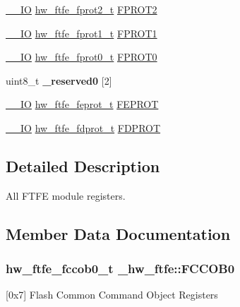 \begin{DoxyCompactItemize}
\item 
\hyperlink{core__sc300_8h_aec43007d9998a0a0e01faede4133d6be}{\+\_\+\+\_\+\+IO} \hyperlink{union__hw__ftfe__fprot2}{hw\+\_\+ftfe\+\_\+fprot2\+\_\+t} \hyperlink{struct__hw__ftfe_a860b1772fd409f3168df994f34e2b3ee}{F\+P\+R\+O\+T2}
\item 
\hyperlink{core__sc300_8h_aec43007d9998a0a0e01faede4133d6be}{\+\_\+\+\_\+\+IO} \hyperlink{union__hw__ftfe__fprot1}{hw\+\_\+ftfe\+\_\+fprot1\+\_\+t} \hyperlink{struct__hw__ftfe_acb23a282239b6ec6378d99218078504e}{F\+P\+R\+O\+T1}
\item 
\hyperlink{core__sc300_8h_aec43007d9998a0a0e01faede4133d6be}{\+\_\+\+\_\+\+IO} \hyperlink{union__hw__ftfe__fprot0}{hw\+\_\+ftfe\+\_\+fprot0\+\_\+t} \hyperlink{struct__hw__ftfe_ad562d41672bfb48e370a644a5b564ff6}{F\+P\+R\+O\+T0}
\item 
uint8\+\_\+t {\bfseries \+\_\+reserved0} \mbox{[}2\mbox{]}\hypertarget{struct__hw__ftfe_a13841b2fb173339e3cc75fdd859d740c}{}\label{struct__hw__ftfe_a13841b2fb173339e3cc75fdd859d740c}

\item 
\hyperlink{core__sc300_8h_aec43007d9998a0a0e01faede4133d6be}{\+\_\+\+\_\+\+IO} \hyperlink{union__hw__ftfe__feprot}{hw\+\_\+ftfe\+\_\+feprot\+\_\+t} \hyperlink{struct__hw__ftfe_ad22796b9d2598ea1304473322e0e3d8b}{F\+E\+P\+R\+OT}
\item 
\hyperlink{core__sc300_8h_aec43007d9998a0a0e01faede4133d6be}{\+\_\+\+\_\+\+IO} \hyperlink{union__hw__ftfe__fdprot}{hw\+\_\+ftfe\+\_\+fdprot\+\_\+t} \hyperlink{struct__hw__ftfe_a8eefd20d25f2d46419a8396479ba64a4}{F\+D\+P\+R\+OT}
\end{DoxyCompactItemize}


\subsection{Detailed Description}
All F\+T\+FE module registers. 

\subsection{Member Data Documentation}
\subsubsection[{\texorpdfstring{F\+C\+C\+O\+B0}{FCCOB0}}]{ {\bf hw\+\_\+ftfe\+\_\+fccob0\+\_\+t} \+\_\+hw\+\_\+ftfe\+::\+F\+C\+C\+O\+B0}\hypertarget{struct__hw__ftfe_a58a38fef821702c27273968c6591469a}{}\label{struct__hw__ftfe_a58a38fef821702c27273968c6591469a}
\mbox{[}0x7\mbox{]} Flash Common Command Object Registers 
